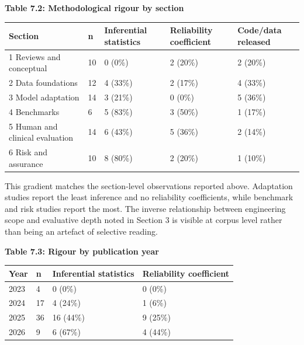 \documentclass[11pt]{article}
\begin{document}
	\begin{center}
		\textbf{Table 7.2: Methodological rigour by section}
		\vspace{2pt}
		
		\footnotesize
		\setlength{\tabcolsep}{3pt}\renewcommand{\arraystretch}{1.1}
		\begin{tabularx}{\textwidth}{|X|X|X|X|X|}
			\hline
			\textbf{Section} & \textbf{n} & \textbf{Inferential statistics} & \textbf{Reliability coefficient} & \textbf{Code/data released} \\
			\hline
			1 Reviews and conceptual & 10 & 0 (0\%) & 2 (20\%) & 2 (20\%) \\
			\hline
			2 Data foundations & 12 & 4 (33\%) & 2 (17\%) & 4 (33\%) \\
			\hline
			3 Model adaptation & 14 & 3 (21\%) & 0 (0\%) & 5 (36\%) \\
			\hline
			4 Benchmarks & 6 & 5 (83\%) & 3 (50\%) & 1 (17\%) \\
			\hline
			5 Human and clinical evaluation & 14 & 6 (43\%) & 5 (36\%) & 2 (14\%) \\
			\hline
			6 Risk and assurance & 10 & 8 (80\%) & 2 (20\%) & 1 (10\%) \\
			\hline
		\end{tabularx}
	\end{center}
	
	This gradient matches the section-level observations reported above. Adaptation studies report the least inference and no reliability coefficients, while benchmark and risk studies report the most. The inverse relationship between engineering scope and evaluative depth noted in Section 3 is visible at corpus level rather than being an artefact of selective reading.
	
	\begin{center}
		\textbf{Table 7.3: Rigour by publication year}
		\vspace{2pt}
		
		\footnotesize
		\setlength{\tabcolsep}{3pt}\renewcommand{\arraystretch}{1.1}
		\begin{tabularx}{\textwidth}{|X|X|X|X|}
			\hline
			\textbf{Year} & \textbf{n} & \textbf{Inferential statistics} & \textbf{Reliability coefficient} \\
			\hline
			2023 & 4 & 0 (0\%) & 0 (0\%) \\
			\hline
			2024 & 17 & 4 (24\%) & 1 (6\%) \\
			\hline
			2025 & 36 & 16 (44\%) & 9 (25\%) \\
			\hline
			2026 & 9 & 6 (67\%) & 4 (44\%) \\
			\hline
		\end{tabularx}
	\end{center}
	
\end{document}
